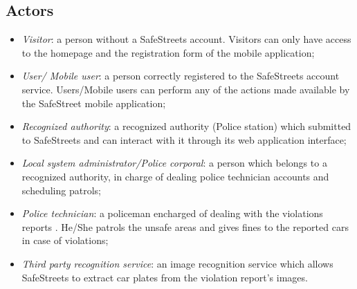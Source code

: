 \subsection{Actors}

\begin{itemize}
    \item \textit{Visitor}: a person without a SafeStreets account. Visitors can only have access to the homepage and the registration form of the mobile application;
    \item \textit{User/ Mobile user}: a person correctly registered to the SafeStreets account service. Users/Mobile users can perform any of the actions made available by the SafeStreet mobile application; 
    \item \textit{Recognized authority}: a recognized authority (Police station) which submitted to SafeStreets and can interact with it through its web application interface;
    \item \textit{Local system administrator/Police corporal}: a person which belongs to a recognized authority, in charge of dealing police technician accounts and scheduling patrols;
    \item \textit{Police technician}: a policeman encharged of dealing with the violations reports . He/She patrols the unsafe areas and gives fines to the reported cars in case of violations;
    \item \textit{Third party recognition service}: an image recognition service which allows SafeStreets to extract car plates from the violation report's images.
\end{itemize}

